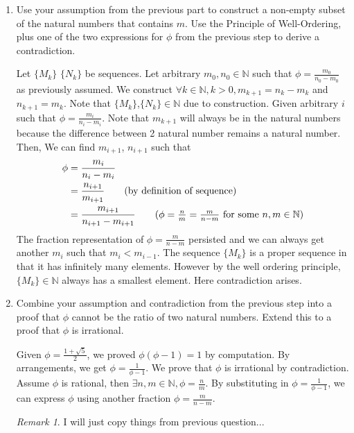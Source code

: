 \documentclass[11pt]{article}
\theoremstyle{plain}%
\theoremstyle{definition}
\theoremstyle{remark}
\newtheorem*{rem}{Remark}
\newcommand{\N}{\mathbb{N}}
\begin{document}
\begin{enumerate}[label=\alph*]
  \item Use your assumption from the previous part to construct a non-empty subset of the natural numbers that contains $m$. Use the Principle of Well-Ordering, plus one of the two expressions for $\phi$ from the previous step to derive a contradiction.

  Let $\{ M_k\}$ $\{ N_k\}$ be sequences. Let arbitrary $m_0, n_0\in\N$ such that $\phi = \frac{m_0}{n_0-m_0}$ as previously assumed. We construct $\forall k\in\N, k> 0, m_{k+1} = n_{k} - m_{k}$ and $n_{k+1} = m_{k}$. Note that $\{ M_k\}$,$\{ N_k\}\in\N$ due to construction. Given arbitrary $i$ such that $\phi = \frac{m_i}{n_i - m_i}$. Note that $m_{k+1}$ will always be in the natural numbers because the difference between 2 natural number remains a natural number. Then, We can find $m_{i+1}$, $n_{i+1}$ such that
  \begin{align*}
    \phi &= \frac{m_i}{n_i - m_i}\\
    &= \frac{n_{i+1}}{m_{i+1}}\tag{by definition of sequence}\\
    &= \frac{m_{i+1}}{n_{i+1} - m_{i+1}} \tag{$\phi = \frac{n}{m} = \frac{m}{n-m}$ for some $n,m\in\N$}
  \end{align*}
  The fraction representation of $\phi = \frac{m}{n-m}$ persisted and we can always get another $m_i$ such that $m_i < m_{i-1}$. The sequence $\{ M_k\}$ is a proper sequence in that it has infinitely many elements. However by the well ordering principle, $\{ M_k\}\in\N$ always has a smallest element. Here contradiction arises.


  \item Combine your assumption and contradiction from the previous step into a proof that $\phi$  cannot be the ratio of two natural numbers. Extend this to a proof that $\phi$ is irrational.

  Given $\phi = \frac{1+\sqrt{5}}{2}$, we proved $\phi(\phi - 1) = 1$ by computation. By arrangements, we get $\phi = \frac{1}{\phi-1}$. We prove that $\phi$ is irrational by contradiction. Assume $\phi$ is rational, then $\exists n,m\in\N, \phi = \frac{n}{m}$. By substituting in $\phi = \frac{1}{\phi-1}$, we can express $\phi$ using another fraction $\phi = \frac{m}{n-m}$.

  \begin{rem}
    I will just copy things from previous question...
  \end{rem}


\end{enumerate}
\end{document}
